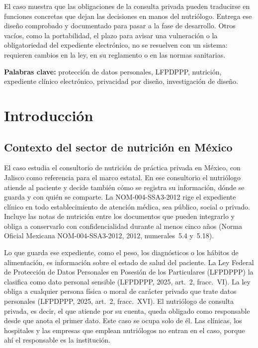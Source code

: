 \documentclass[12pt, a4paper]{article}
\makeatletter
\newcommand{\saltoseccion}{\par
  \ifx\@deferlist\@empty
    \ifdim\pagegoal<\maxdimen
      \ifdim\dimexpr\textheight-\pagegoal+\pagetotal\relax>0.5\textheight\clearpage\fi
    \fi
  \else\clearpage\fi}
\let\seccionbase\section
\renewcommand{\section}{\saltoseccion\seccionbase}
\makeatother
\begin{document}
El caso muestra que las obligaciones de la consulta privada pueden
traducirse en funciones concretas que dejan las decisiones en manos del
nutriólogo. Entrega ese diseño comprobado y documentado para pasar a la
fase de desarrollo. Otros vacíos, como la portabilidad, el plazo para
avisar una vulneración o la obligatoriedad del expediente electrónico,
no se resuelven con un sistema: requieren cambios en la ley, en su
reglamento o en las normas sanitarias.
 
\noindent\textbf{Palabras clave:} protección de datos personales,
LFPDPPP, nutrición, expediente clínico electrónico, privacidad por
diseño, investigación de diseño.

\section{Introducción}

\subsection{Contexto del sector de nutrición en México}
El caso estudia el consultorio de nutrición de práctica privada en
México, con Jalisco como referencia para el marco estatal. En ese
consultorio el nutriólogo atiende al paciente y decide también cómo se
registra su información, dónde se guarda y con quién se comparte. La
NOM-004-SSA3-2012 rige el expediente clínico en todo establecimiento de
atención médica, sea público, social o privado. Incluye las notas de
nutrición entre los documentos que pueden integrarlo y obliga a
conservarlo con confidencialidad durante al menos cinco años (Norma
Oficial Mexicana NOM-004-SSA3-2012, 2012, numerales~5.4 y~5.18).
 
Lo que guarda ese expediente, como el peso, los diagnósticos o los
hábitos de alimentación, es información sobre el estado de salud del
paciente. La Ley Federal de Protección de Datos Personales en Posesión
de los Particulares (LFPDPPP) la clasifica como dato personal sensible
(LFPDPPP, 2025, art.~2, fracc.~VI). La ley obliga a cualquier persona
física o moral de carácter privado que trate datos personales
(LFPDPPP, 2025, art.~2, fracc.~XVI). El nutriólogo de consulta
privada, es decir, el que atiende por su cuenta, queda obligado como
responsable desde que anota el primer dato. Este caso se ocupa solo de
él. Las clínicas, los hospitales y las empresas que emplean
nutriólogos no entran en el caso, porque ahí el responsable es la
institución.
 
\end{document}
